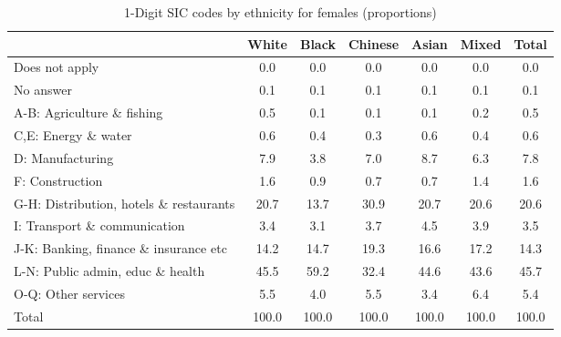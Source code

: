 \begin{table}[htbp]\centering
\def\sym#1{\ifmmode^{#1}\else\(^{#1}\)\fi}
\caption{1-Digit SIC codes by ethnicity for females (proportions)}
\begin{tabular}{l*{6}{c}}
\hline\hline
          &    White&    Black&  Chinese&    Asian&    Mixed&    Total\\
\hline
Does not apply&      0.0&      0.0&      0.0&      0.0&      0.0&      0.0\\
No answer &      0.1&      0.1&      0.1&      0.1&      0.1&      0.1\\
A-B: Agriculture \& fishing&      0.5&      0.1&      0.1&      0.1&      0.2&      0.5\\
C,E: Energy \& water&      0.6&      0.4&      0.3&      0.6&      0.4&      0.6\\
D: Manufacturing&      7.9&      3.8&      7.0&      8.7&      6.3&      7.8\\
F: Construction&      1.6&      0.9&      0.7&      0.7&      1.4&      1.6\\
G-H: Distribution, hotels \& restaurants&     20.7&     13.7&     30.9&     20.7&     20.6&     20.6\\
I: Transport \& communication&      3.4&      3.1&      3.7&      4.5&      3.9&      3.5\\
J-K: Banking, finance \& insurance etc&     14.2&     14.7&     19.3&     16.6&     17.2&     14.3\\
L-N: Public admin, educ \& health&     45.5&     59.2&     32.4&     44.6&     43.6&     45.7\\
O-Q: Other services&      5.5&      4.0&      5.5&      3.4&      6.4&      5.4\\
Total     &    100.0&    100.0&    100.0&    100.0&    100.0&    100.0\\
\hline\hline
\end{tabular}
\end{table}
